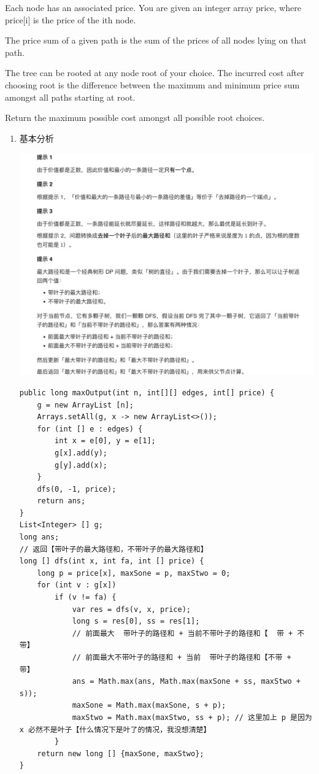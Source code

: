 \documentclass[9pt, b5paaper]{book}
\begin{document}
Each node has an associated price. You are given an integer array price, where price[i] is the price of the ith node.

The price sum of a given path is the sum of the prices of all nodes lying on that path.

The tree can be rooted at any node root of your choice. The incurred cost after choosing root is the difference between the maximum and minimum price sum amongst all paths starting at root.

Return the maximum possible cost amongst all possible root choices.
\begin{enumerate}
\item 基本分析
\label{sec-1-4-2-1}

\includegraphics[width=.9\linewidth]{./pic/graph_20230412_132942.png}
\begin{verbatim}
public long maxOutput(int n, int[][] edges, int[] price) {
    g = new ArrayList [n];
    Arrays.setAll(g, x -> new ArrayList<>());
    for (int [] e : edges) {
        int x = e[0], y = e[1];
        g[x].add(y);
        g[y].add(x);
    }
    dfs(0, -1, price);
    return ans;
}
List<Integer> [] g;
long ans;
// 返回【带叶子的最大路径和，不带叶子的最大路径和】
long [] dfs(int x, int fa, int [] price) {
    long p = price[x], maxSone = p, maxStwo = 0;
    for (int v : g[x]) 
        if (v != fa) {
            var res = dfs(v, x, price);
            long s = res[0], ss = res[1];
            // 前面最大  带叶子的路径和 + 当前不带叶子的路径和【  带 + 不带】
            // 前面最大不带叶子的路径和 + 当前  带叶子的路径和【不带 +   带】
            ans = Math.max(ans, Math.max(maxSone + ss, maxStwo + s));
            maxSone = Math.max(maxSone, s + p);
            maxStwo = Math.max(maxStwo, ss + p); // 这里加上 p 是因为 x 必然不是叶子【什么情况下是叶了的情况，我没想清楚】
        }
    return new long [] {maxSone, maxStwo};
}
\end{verbatim}
\end{enumerate}
\end{document}
